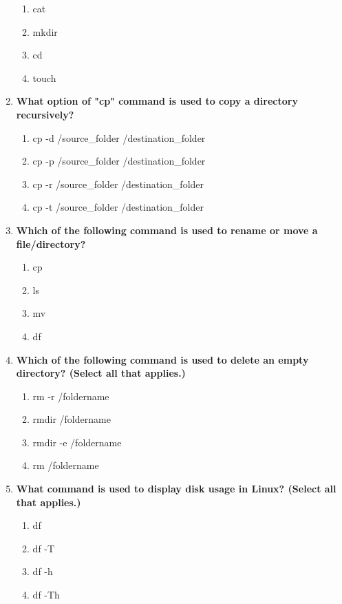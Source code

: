\begin{flushleft}
\begin{enumerate}
\begin{enumerate}[label=(\alph*)]
			\item cat    %
			\item mkdir
			\item cd
			\item touch    %
		\end{enumerate}
		\bigskip
		\bigskip
		\item \textbf{What option of "cp" command is used to copy a directory recursively?}
		\begin{enumerate}[label=(\alph*)]
			\item cp -d /source\_folder /destination\_folder
			\item cp -p /source\_folder /destination\_folder
			\item cp -r /source\_folder /destination\_folder  %
			\item cp -t /source\_folder /destination\_folder
		\end{enumerate}
		\bigskip
		\bigskip
		\item \textbf{Which of the following command is used to rename or move a file/directory?}
		\begin{enumerate}[label=(\alph*)]
			\item cp
			\item ls
			\item mv %
			\item df 
		\end{enumerate}
		\bigskip
		\bigskip
		\item \textbf{Which of the following command is used to delete an empty directory? (Select all that applies.)}
		\begin{enumerate}[label=(\alph*)]
			\item rm -r /foldername   %
			\item rmdir /foldername  %
			\item rmdir -e /foldername
			\item rm /foldername
		\end{enumerate}
		\bigskip
		\bigskip
		\item \textbf{What command is used to display disk usage in Linux? (Select all that applies.)}
		\begin{enumerate}[label=(\alph*)]
			\item df     %
			\item df -T  %
			\item df -h  %
			\item df -Th %
		\end{enumerate}

\end{enumerate}
\end{flushleft}
